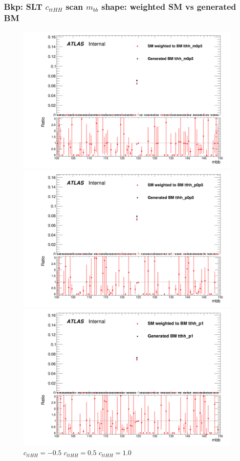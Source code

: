 \documentclass[twoside,11pt]{beamer}
\begin{document}
\begin{frame}
    \frametitle{Bkp: SLT $c_{ttHH}$ scan $m_{bb}$ shape: weighted SM vs generated BM}
\begin{figure}
    \includegraphics[width=.32\textwidth]{figures/Method_B_all_latest/BMtthh_m0p5h_mbb.png}
    \includegraphics[width=.32\textwidth]{figures/Method_B_all_latest/BMtthh_p0p5h_mbb.png}
    \includegraphics[width=.32\textwidth]{figures/Method_B_all_latest/BMtthh_p1h_mbb.png}
    $c_{ttHH} = -0.5$ \hspace{5em} $c_{ttHH} = 0.5$\hspace{5em} $c_{ttHH} = 1.0$    
\end{figure}

\end{frame}   
\end{document}
